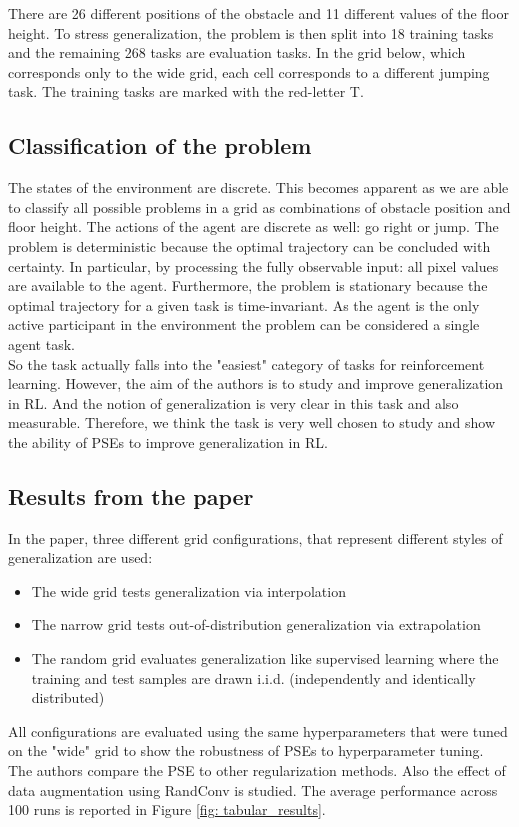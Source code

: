 \documentclass{usiinftr}
\begin{document}
There are 26 different positions of the obstacle and 11 different values of the floor height. To stress generalization, the problem is then split into 18 training tasks and the remaining 268 tasks  are evaluation tasks. In the grid below, which corresponds only to the wide grid, each cell corresponds to a different jumping task. The training tasks are marked with the red-letter T. 


\subsection{Classification of the problem}
The states of the environment are discrete. This becomes apparent as we are able to classify all possible problems in a grid as combinations of obstacle position and floor height.
The actions of the agent are discrete as well: go right or jump.
The problem is deterministic because the optimal trajectory can be concluded with certainty.
In particular, by processing the fully observable input: all pixel values are available to the agent.
Furthermore, the problem is stationary because the optimal trajectory for a given task is time-invariant.
As the agent is the only active participant in the environment the problem can be considered a single agent task.
\\
So the task actually falls into the "easiest" category of tasks for reinforcement learning. However, the aim of the authors is to study and improve generalization in RL. And the notion of generalization is very clear in this task and also measurable. Therefore, we think the task is very well chosen to study and show the ability of PSEs to improve generalization in RL.
\subsection{Results from the paper}
In the paper, three different grid configurations, that represent different styles of generalization are used:
\begin{itemize}
\item The wide grid tests generalization via interpolation
\item The narrow grid tests out-of-distribution generalization via extrapolation
\item The random grid evaluates generalization like supervised learning where the training and test samples are drawn i.i.d. (independently and identically distributed) 
\end{itemize}
All configurations are evaluated using the same hyperparameters that were tuned on the "wide" grid to show the robustness of PSEs to hyperparameter tuning. The authors compare the PSE to other regularization methods. Also the effect of data augmentation using RandConv is studied. The average performance across 100 runs is reported in Figure \ref{fig: tabular_results}. 
\end{document}
